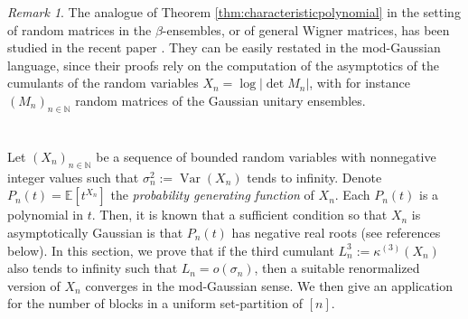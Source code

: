 \documentclass[12pt,a4paper,reqno]{amsart}
\theoremstyle{remark}
\newtheorem{remark}[lemma]{Remark}
\newcommand{\N}{\mathbb{N}}
\newcommand{\esper}{\mathbb{E}}
\DeclareMathOperator\Var{Var}
\begin{document}
\begin{remark}
The analogue of Theorem \ref{thm:characteristicpolynomial} in the setting of random matrices in the $\beta$-ensembles, or of general Wigner matrices, has been studied in the recent paper \cite{DE13}. They can be easily restated in the mod-Gaussian language, since their proofs rely on the computation of the asymptotics of the cumulants of the random variables $X_{n}=\log|\det M_{n}|$, with for instance $(M_{n})_{n \in \N}$ random matrices of the Gaussian unitary ensembles.
\end{remark}
\bigskip
\bigskip

















\section{ }
\label{sec:zeros} 
Let $(X_n)_{n \in \N}$ be a sequence of bounded random variables with nonnegative integer values such that $\sigma_n^2:=\Var(X_n)$ tends to infinity. Denote $P_n(t)= \esper[t^{X_n}]$ the {\em probability generating function} of $X_n$.  Each $P_n(t)$ is a polynomial in $t$. Then, it is known that a sufficient condition so that $X_n$ is asymptotically Gaussian is that $P_n(t)$ has negative real roots (see references below). In this section, we prove that if the third cumulant $L_n^3:=\kappa^{(3)}(X_n)$ also tends to infinity such that $L_n=o(\sigma_n)$, then a suitable renormalized version of $X_n$ converges in the mod-Gaussian sense. We then give an application for the number of blocks in a uniform set-partition of $[n]$.
\bigskip
\end{document}
